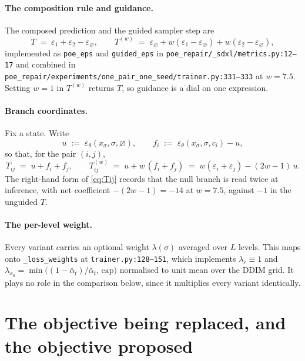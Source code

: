 \documentclass[11pt]{article}
\newcommand{\eps}{\varepsilon}
\newcommand{\epsth}{\eps_\theta}
\newcommand{\xs}{x_\sigma}
\newcommand{\cnull}{\varnothing}
\theoremstyle{plain}
\theoremstyle{remark}
\begin{document}
\paragraph{The composition rule and guidance.}
The composed prediction and the guided sampler step are
\begin{equation}
  T \;=\; \eps_1 + \eps_2 - \eps_\cnull,
  \qquad
  T^{(w)} \;=\; \eps_\cnull + w(\eps_1 - \eps_\cnull) + w(\eps_2 - \eps_\cnull),
  \label{eq:compose}
\end{equation}
implemented as \texttt{poe\_eps} and \texttt{guided\_eps} in
\texttt{poe\_repair/\_sdxl/metrics.py:12--17} and combined in
\texttt{poe\_repair/experiments/one\_pair\_one\_seed/trainer.py:331--333} at $w = 7.5$.
Setting $w = 1$ in $T^{(w)}$ returns $T$, so guidance is a dial on one expression.

\paragraph{Branch coordinates.}
Fix a state. Write
\begin{equation}
  u \;:=\; \epsth(\xs,\sigma,\cnull),
  \qquad
  f_i \;:=\; \epsth(\xs,\sigma,c_i) - u,
  \label{eq:coords}
\end{equation}
so that, for the pair $(i,j)$,
\begin{equation}
  T_{ij} \;=\; u + f_i + f_j,
  \qquad
  T^{(w)}_{ij} \;=\; u + w\,(f_i + f_j)
  \;=\; w(\eps_i + \eps_j) - (2w-1)\,u .
  \label{eq:Tij}
\end{equation}
The right-hand form of \eqref{eq:Tij} records that the null branch is read twice at inference,
with net coefficient $-(2w-1) = -14$ at $w = 7.5$, against $-1$ in the unguided $T$.

\paragraph{The per-level weight.}
Every variant carries an optional weight $\lambda(\sigma)$ averaged over $L$ levels. This maps
onto \texttt{\_loss\_weights} at \texttt{trainer.py:128--151}, which implements
$\lambda_{\eps} \equiv 1$ and $\lambda_{x_0} = \min\!\big((1-\bar\alpha_t)/\bar\alpha_t,\,
\mathrm{cap}\big)$ normalised to unit mean over the DDIM grid. It plays no role in the
comparison below, since it multiplies every variant identically.

\section{The objective being replaced, and the objective proposed}
\end{document}
